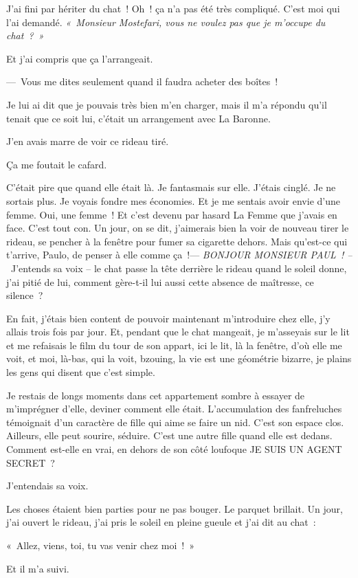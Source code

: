 \documentclass[french,twoside]{book} %
\begin{document}
\noindent J’ai fini par hériter du chat ! Oh ! ça n’a pas été très compliqué. C’est moi qui l’ai demandé. \emph{« Monsieur Mostefari, vous ne voulez pas que je m’occupe du chat ? »}\par
Et j’ai compris que ça l’arrangeait.\par
— Vous me dites seulement quand il faudra acheter des boîtes !\par
Je lui ai dit que je pouvais très bien m’en charger, mais il m’a répondu qu’il tenait que ce soit lui, c’était un arrangement avec La Baronne.\par
J’en avais marre de voir ce rideau tiré.\par
Ça me foutait le cafard.\par
C’était pire que quand elle était là. Je fantasmais sur elle. J’étais cinglé. Je ne sortais plus. Je voyais fondre mes économies. Et je me sentais avoir envie d’une femme. Oui, une femme ! Et c’est devenu par hasard La Femme que j’avais en face. C’est tout con. Un jour, on se dit, j’aimerais bien la voir de nouveau tirer le rideau, se pencher à la fenêtre pour fumer sa cigarette dehors. Mais qu’est-ce qui t’arrive, Paulo, de penser à elle comme ça !— \emph{BONJOUR MONSIEUR PAUL ! –} J’entends sa voix – le chat passe la tête derrière le rideau quand le soleil donne, j’ai pitié de lui, comment gère-t-il lui aussi cette absence de maîtresse, ce silence ?\par
En fait, j’étais bien content de pouvoir maintenant m’introduire chez elle, j’y allais trois fois par jour. Et, pendant que le chat mangeait, je m’asseyais sur le lit et me refaisais le film du tour de son appart, ici le lit, là la fenêtre, d’où elle me voit, et moi, là-bas, qui la voit, bzouing, la vie est une géométrie bizarre, je plains les gens qui disent que c’est simple.\par
Je restais de longs moments dans cet appartement sombre à essayer de m’imprégner d’elle, deviner comment elle était. L’accumulation des fanfreluches témoignait d’un caractère de fille qui aime se faire un nid. C’est son espace clos. Ailleurs, elle peut sourire, séduire. C’est une autre fille quand elle est dedans. Comment est-elle en vrai, en dehors de son côté loufoque JE SUIS UN AGENT SECRET ?\par
J’entendais sa voix.\par
Les choses étaient bien parties pour ne pas bouger. Le parquet brillait. Un jour, j’ai ouvert le rideau, j’ai pris le soleil en pleine gueule et j’ai dit au chat :\par
« Allez, viens, toi, tu vas venir chez moi ! »\par
Et il m’a suivi.
\end{document}

